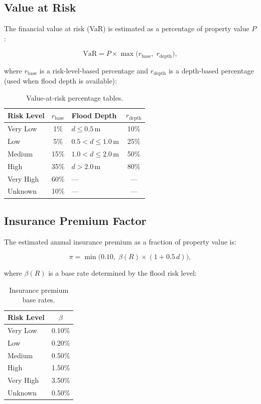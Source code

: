 \documentclass[11pt,a4paper]{article}
\begin{document}
\subsection{Value at Risk}

The financial value at risk (VaR) is estimated as a percentage of property value $P$:

\[
\text{VaR} = P \times \max\!\big(r_{\text{base}},\; r_{\text{depth}}\big),
\]

\noindent where $r_{\text{base}}$ is a risk-level-based percentage and $r_{\text{depth}}$ is a depth-based percentage (used when flood depth is available):

\begin{table}[H]
\centering
\caption{Value-at-risk percentage tables.}
\label{tab:var_pcts}
\begin{tabular}{lc|lc}
\toprule
\textbf{Risk Level} & $r_{\text{base}}$ & \textbf{Flood Depth} & $r_{\text{depth}}$ \\
\midrule
Very Low  & 1\%  & $d \leq 0.5$\,m & 10\% \\
Low       & 5\%  & $0.5 < d \leq 1.0$\,m & 25\% \\
Medium    & 15\% & $1.0 < d \leq 2.0$\,m & 50\% \\
High      & 35\% & $d > 2.0$\,m & 80\% \\
Very High & 60\% & --- & --- \\
Unknown   & 10\% & --- & --- \\
\bottomrule
\end{tabular}
\end{table}

\subsection{Insurance Premium Factor}

The estimated annual insurance premium as a fraction of property value is:

\[
\pi = \min\!\Big(0.10,\; \beta(R) \times (1 + 0.5\, d)\Big),
\]

\noindent where $\beta(R)$ is a base rate determined by the flood risk level:

\begin{table}[H]
\centering
\caption{Insurance premium base rates.}
\label{tab:insurance_rates}
\begin{tabular}{lc}
\toprule
\textbf{Risk Level} & $\beta$ \\
\midrule
Very Low  & 0.10\% \\
Low       & 0.20\% \\
Medium    & 0.50\% \\
High      & 1.50\% \\
Very High & 3.50\% \\
Unknown   & 0.50\% \\
\bottomrule
\end{tabular}
\end{table}
\end{document}
